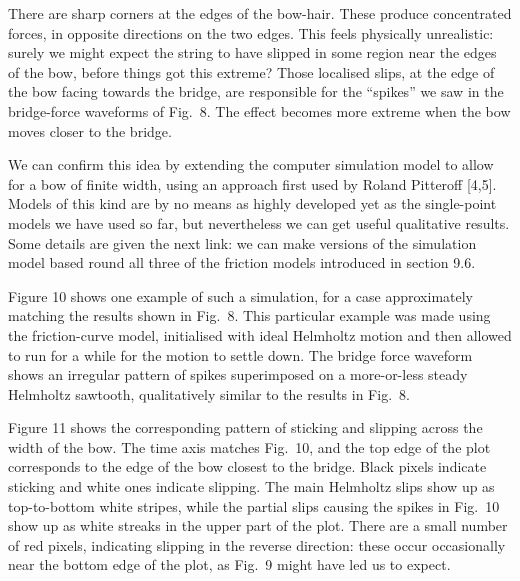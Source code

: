   There are sharp corners at the edges of the bow-hair. These produce 
  concentrated forces, in opposite directions on the two edges. This feels 
  physically unrealistic: surely we might expect the string to have slipped in 
  some region near the edges of the bow, before things got this extreme? Those 
  localised slips, at the edge of the bow facing towards the bridge, are 
  responsible for the “spikes” we saw in the bridge-force waveforms of Fig.\ 8. 
  The effect becomes more extreme when the bow moves closer to the bridge. 

  We can confirm this idea by extending the computer simulation model to allow 
  for a bow of finite width, using an approach first used by Roland Pitteroff 
  [4,5]. Models of this kind are by no means as highly developed yet as the 
  single-point models we have used so far, but nevertheless we can get useful 
  qualitative results. Some details are given the next link: we can make 
  versions of the simulation model based round all three of the friction models 
  introduced in section 9.6. 

  Figure 10 shows one example of such a simulation, for a case approximately 
  matching the results shown in Fig.\ 8. This particular example was made using 
  the friction-curve model, initialised with ideal Helmholtz motion and then 
  allowed to run for a while for the motion to settle down. The bridge force 
  waveform shows an irregular pattern of spikes superimposed on a more-or-less 
  steady Helmholtz sawtooth, qualitatively similar to the results in Fig.\ 8. 


  Figure 11 shows the corresponding pattern of sticking and slipping across the 
  width of the bow. The time axis matches Fig.\ 10, and the top edge of the 
  plot corresponds to the edge of the bow closest to the bridge. Black pixels 
  indicate sticking and white ones indicate slipping. The main Helmholtz slips 
  show up as top-to-bottom white stripes, while the partial slips causing the 
  spikes in Fig.\ 10 show up as white streaks in the upper part of the plot. 
  There are a small number of red pixels, indicating slipping in the reverse 
  direction: these occur occasionally near the bottom edge of the plot, as 
  Fig.\ 9 might have led us to expect. 

